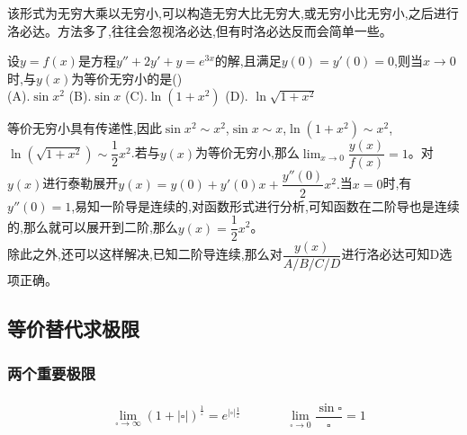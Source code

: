 \documentclass[8pt a4paper, oneside, UTF8]{ctexbook}
\begin{document}
\begin{sloppypar}
\begin{solution}
    \end{solution}
    \begin{note}
        该形式为无穷大乘以无穷小,可以构造无穷大比无穷大,或无穷小比无穷小,之后进行洛必达。方法多了,往往会忽视洛必达,但有时洛必达反而会简单一些。
    \end{note}
    \begin{problem}
        设$y=f(x)$是方程$y''+2y'+y=e^{3x}$的解,且满足$y(0)=y'(0)=0$,则当$x\to 0$时,与$y(x)$为等价无穷小的是()\\
        (A).$\sin x^2$ \qquad (B).$\sin x$ \qquad (C).$\ln(1+x^2)$ \qquad (D). $\ln \sqrt{1+x^2}$
    \end{problem}
    \begin{solution}
        等价无穷小具有传递性,因此$\sin x^2 \sim x^2$,$\sin x \sim x$,$\ln (1+x^2) \sim x^2$,$\ln (\sqrt{1+x^2})\sim \dfrac{1}{2}x^2$.若与$y(x)$为等价无穷小,那么$\lim_{x\to 0}\dfrac{y(x)}{f(x)}=1$。对$y(x)$进行泰勒展开$y(x)=y(0)+y'(0)x+\dfrac{y''(0)}{2}x^2.$当$x=0$时,有$y''(0)=1$,易知一阶导是连续的,对函数形式进行分析,可知函数在二阶导也是连续的,那么就可以展开到二阶,那么$y(x)=\dfrac{1}{2}x^2$。\\
        除此之外,还可以这样解决,已知二阶导连续,那么对$\dfrac{y(x)}{A/B/C/D}$进行洛必达可知D选项正确。
    \end{solution}
    \subsection{等价替代求极限}
    \subsubsection{两个重要极限}
    \begin{align*} \boxed
        {
            \begin{aligned}
                 & \lim_{\square \to \infty }(1+|\square|)^{\frac{1}{\square}}=e^{|\square| \frac{1}{\square}} \qquad    & &  \lim _ { \square \rightarrow 0 } \dfrac { \sin \square } { \square } = 1 \\
            \end{aligned}
        }
    \end{align*}

\end{sloppypar}
\end{document}
